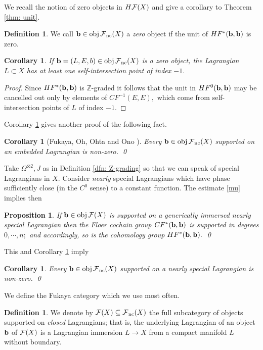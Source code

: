 \documentclass{article}
\theoremstyle{plain}%
\newtheorem{prop}[thm]{Proposition}
\newtheorem{cor}[thm]{Corollary}
\theoremstyle{definition}
\newtheorem{dfn}[thm]{Definition}
\numberwithin{equation}{section}
\numberwithin{figure}{section}
\def\eq{\eqref}
\def\l{\label}
\def\cF{{\mathbin{\cal F}}}
\def\Z{{\mathbin{\mathbb Z}}}
\def\Om{\Omega}
\def\sb{\subseteq}
\begin{document}
We recall the notion of zero objects in $H\cF(X)$ and give a corollary to Theorem \ref{thm: unit}.
\begin{dfn}
We call $\b\in \obj\cF_\nc(X)$ a {\it zero} object if the unit of $HF^*({\mathbf{b}},{\mathbf{b}})$ is zero.
\end{dfn}
\begin{cor}\l{cor: unit}
If $\b=(L,E,b)\in \obj\cF_\nc(X)$ is a zero object, the Lagrangian $L\subset X$ has at least one self-intersection point of index $-1.$ 
\end{cor}
\begin{proof}
Since $HF^*({\mathbf{b}},{\mathbf{b}})$ is $\Z$-graded it follows that the unit in $HF^0({\mathbf{b}},{\mathbf{b}})$ may be cancelled out only by elements of $CF^{-1}(E,E),$
which come from self-intersection points of $L$ of index $-1.$
\end{proof}
Corollary \ref{cor: unit} gives another proof of the following fact.
\begin{cor}[Fukaya, Oh, Ohta and Ono {\cite[Theorem E]{FOOO}}]\l{embedded non-zero}
Every $\b\in \obj\cF_\nc(X)$ supported on an embedded Lagrangian is non-zero. \qed
\end{cor}

Take $\Om^{\otimes2},J$ as in Definition \ref{dfn: Z-grading} so that we can speak of special Lagrangians in $X.$
Consider {\it nearly} special Lagrangians which have phase sufficiently close (in the $C^0$ sense) to a constant function. The estimate \eq{mu} implies then 
\begin{prop}\l{prop: TY0}
If $\b\in \obj\cF(X)$ is supported on a generically immersed nearly special Lagrangian then the Floer cochain group $CF^*({\mathbf{b}},{\mathbf{b}})$ is supported in degrees $0,\cdots,n;$ and accordingly, so is the cohomology group $HF^*({\mathbf{b}},{\mathbf{b}}).$ \qed
\end{prop}
This and Corollary \ref{cor: unit} imply
\begin{cor}\l{cor: special non-zero}
Every $\b\in \obj\cF_\nc(X)$ supported on a nearly special Lagrangian is non-zero. \qed
\end{cor}

We define the Fukaya category which we use most often.
\begin{dfn}\l{dfn: Fuk}
We denote by $\cF(X)\sb \cF_\nc(X)$ the full subcategory of objects supported on {\it closed} Lagrangians; that is, the underlying Lagrangian of an object ${\mathbf{b}}$ of $\cF(X)$ is a Lagrangian immersion $L\to X$ from a compact manifold $L$ without boundary. 
\end{dfn}
\end{document}
